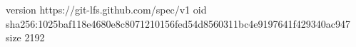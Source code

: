 version https://git-lfs.github.com/spec/v1
oid sha256:1025baf118e4680e8c8071210156fed54d8560311bc4e9197641f429340ac947
size 2192
